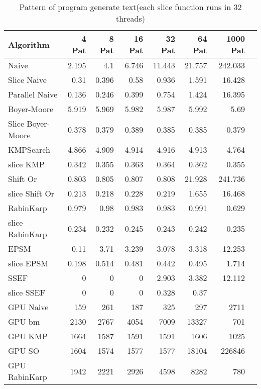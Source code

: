 \documentclass[11pt]{article}       %
\begin{document}
\begin{table}[htbp]
  \centering
  \caption{Pattern of program generate text(each slice function runs in 32 threads)}
    \begin{tabular}{lrrrrrrr}\label{t3}
Algorithm & 4 Pat & 8 Pat & 16 Pat & 32 Pat & 64 Pat & 1000 Pat \\
 \hline
    Naive & 2.195 & 4.1   & 6.746 & 11.443 & 21.757 & 242.033 \\
    Slice Naive & 0.31  & 0.396 & 0.58  & 0.936 & 1.591 & 16.428 \\
    Parallel Naive & 0.136 & 0.246 & 0.399 & 0.754 & 1.424 & 16.395 \\
    {Boyer-Moore} & 5.919 & 5.969 & 5.982 & 5.987 & 5.992 & 5.69 \\
    Slice Boyer-Moore & 0.378 & 0.379 & 0.389 & 0.385 & 0.385 & 0.379 \\
    KMPSearch & 4.866 & 4.909 & 4.914 & 4.916 & 4.913 & 4.764 \\
    slice KMP & 0.342 & 0.355 & 0.363 & 0.364 & 0.362 & 0.355 \\
    Shift Or & 0.803 & 0.805 & 0.807 & 0.808 & 21.928 & 241.736 \\
    slice Shift Or & 0.213 & 0.218 & 0.228 & 0.219 & 1.655 & 16.468 \\
    RabinKarp & 0.979 & 0.98  & 0.983 & 0.983 & 0.991 & 0.629 \\
    slice RabinKarp & 0.234 & 0.232 & 0.245 & 0.243 & 0.242 & 0.235 \\
    EPSM  & 0.11  & 3.71  & 3.239 & 3.078 & 3.318 & 12.253 \\
    slice EPSM & 0.198 & 0.514 & 0.481 & 0.442 & 0.495 & 1.714 \\
    SSEF  & 0     & 0     & 0     & 2.903 & 3.382 & 12.112 \\
    slice SSEF & 0 & 0 & 0 & 0.328 & 0.37  &  \\
    GPU Naive & 159   & 261   & 187   & 325   & 297   & 2711 \\
    GPU bm & 2130  & 2767  & 4054  & 7009  & 13327 & 701 \\
    GPU KMP & 1664  & 1587  & 1591  & 1591  & 1606  & 1025 \\
    GPU SO & 1604  & 1574  & 1577  & 1577  & 18104 & 226846 \\
    GPU RabinKarp & 1942  & 2221  & 2926  & 4598  & 8282  & 780 \\

    \end{tabular}%
  \label{tab:addlabel}%
\end{table}%
\end{document}
